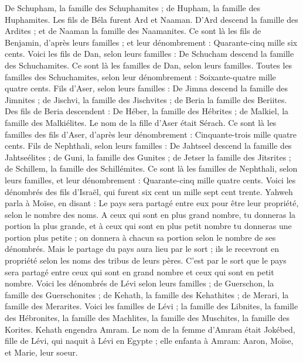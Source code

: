 \begin{multicols}{2}
De Schupham, la famille des Schuphamites ; de Hupham, la famille des Huphamites.
Les fils de Béla furent Ard et Naaman. D'Ard descend la famille des Ardites ; et de Naaman la famille des Naamanites.
Ce sont là les fils de Benjamin, d'après leurs familles ; et leur dénombrement : Quarante-cinq mille six cents.
Voici les fils de Dan, selon leurs familles : De Schucham descend la famille des Schuchamites. Ce sont là les familles de Dan, selon leurs familles.
Toutes les familles des Schuchamites, selon leur dénombrement : Soixante-quatre mille quatre cents.
Fils d'Aser, selon leurs familles : De Jimna descend la famille des Jimnites ; de Jischvi, la famille des Jischvites ; de Beria la famille des Beriites.
Des fils de Beria descendent : De Héber, la famille des Hébrites ; de Malkiel, la famille des Malkiélites.
Le nom de la fille d'Aser était Sérach.
Ce sont là les familles des fils d'Aser, d'après leur dénombrement : Cinquante-trois mille quatre cents.
Fils de Nephthali, selon leurs familles : De Jahtseel descend la famille des Jahtseélites ; de Guni, la famille des Gunites ;
de Jetser la famille des Jitsrites ; de Schillem, la famille des Schillémites.
Ce sont là les familles de Nephthali, selon leurs familles, et leur dénombrement : Quarante-cinq mille quatre cents.
Voici les dénombrés des fils d'Israël, qui furent six cent un mille sept cent trente.
Yahweh parla à Moïse, en disant :
Le pays sera partagé entre eux pour être leur propriété, selon le nombre des noms.
A ceux qui sont en plus grand nombre, tu donneras la portion la plus grande, et à ceux qui sont en plus petit nombre tu donneras une portion plus petite ; on donnera à chacun sa portion selon le nombre de ses dénombrés.
Mais le partage du pays aura lieu par le sort ; ils le recevront en propriété selon les noms des tribus de leurs pères.
C'est par le sort que le pays sera partagé entre ceux qui sont en grand nombre et ceux qui sont en petit nombre.
Voici les dénombrés de Lévi selon leurs familles ; de Guerschon, la famille des Guerschonites ; de Kehath, la famille des Kehathites ; de Merari, la famille des Merarites.
Voici les familles de Lévi ; la famille des Libnites, la famille des Hébronites, la famille des Machlites, la famille des Muschites, la famille des Korites. Kehath engendra Amram.
Le nom de la femme d'Amram était Jokébed, fille de Lévi, qui naquit à Lévi en Egypte ; elle enfanta à Amram: Aaron, Moïse, et Marie, leur soeur.

\end{multicols}
